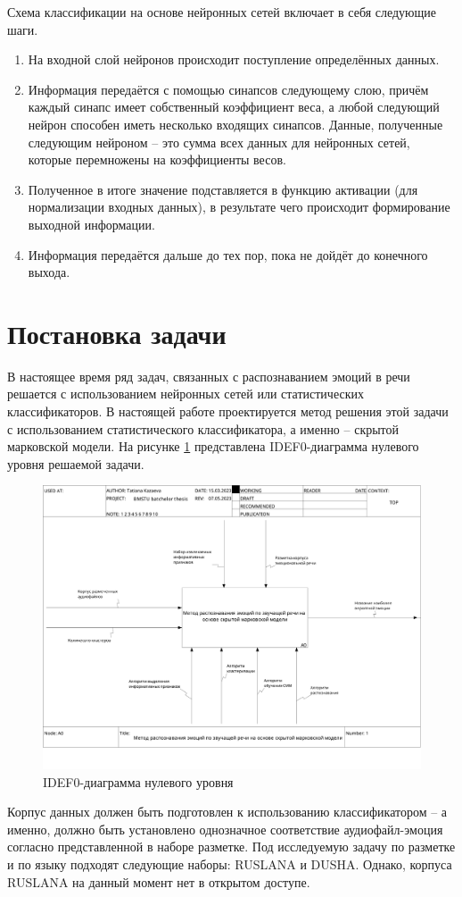 Схема классификации на основе нейронных сетей включает в себя следующие шаги.
\begin{enumerate}
	\item На входной слой нейронов происходит поступление определённых данных.
	\item Информация передаётся с помощью синапсов следующему слою, причём каждый синапс имеет собственный коэффициент веса, а любой следующий нейрон способен иметь несколько входящих синапсов. Данные, полученные следующим нейроном -- это сумма всех данных для нейронных сетей, которые перемножены на коэффициенты весов.
	\item Полученное в итоге значение подставляется в функцию активации (для нормализации входных данных), в результате чего происходит формирование выходной информации.
	\item Информация передаётся дальше до тех пор, пока не дойдёт до конечного выхода.
\end{enumerate}	

\section{Постановка задачи}
В настоящее время ряд задач, связанных с распознаванием эмоций в речи решается с использованием нейронных сетей или статистических классификаторов. В настоящей работе проектируется метод решения этой задачи с использованием статистического классификатора, а именно -- скрытой марковской модели. На рисунке \ref{fig:idef0} представлена IDEF0-диаграмма нулевого уровня решаемой задачи.
\begin{figure}[H]
	\centering
	\includegraphics[width=\linewidth]{assets/01_A0}
	\caption{IDEF0-диаграмма нулевого уровня}
	\label{fig:idef0}
\end{figure}
Корпус данных должен быть подготовлен к использованию классификатором -- а именно, должно быть установлено однозначное соответствие аудиофайл-эмоция согласно представленной в наборе разметке. Под исследуемую задачу по разметке и по языку подходят следующие наборы: RUSLANA и DUSHA. Однако, корпуса RUSLANA на данный момент нет в открытом доступе.

